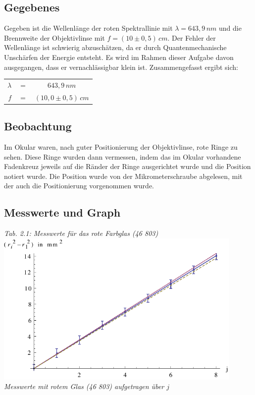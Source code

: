 \subsection{Gegebenes}
Gegeben ist die Wellenlänge der roten Spektrallinie mit \(\lambda = 643,9\,nm\) und die Brennweite der Objektivlinse mit \(f = (10\pm 0,5)\,cm\). Der Fehler der Wellenlänge ist schwierig abzuschätzen, da er durch Quantenmechanische Unschärfen der Energie entsteht. Es wird im Rahmen dieser  Aufgabe davon ausgegangen, dass er vernachlässigbar klein ist. Zusammengefasst ergibt sich:

\begin{center}
\begin{tabular}{rcc}
\(\lambda\) & \(=\) & \(643,9\, nm\) \\
\(f\) & \(=\) & \(\left( 10,0 \pm 0,5 \right)\, cm\) \\
\end{tabular}
\end{center}

\subsection{Beobachtung}
Im Okular waren, nach guter Positionierung der Objektivlinse, rote Ringe zu sehen. Diese Ringe wurden dann vermessen, indem das im Okular vorhandene Fadenkreuz jeweils auf die Ränder der Ringe ausgerichtet wurde und die Position notiert wurde. Die Position wurde von der Mikrometerschraube abgelesen, mit der auch die Positionierung vorgenommen wurde.

\subsection{Messwerte und Graph}
\begin{center}

{\it Tab. 2.1: Messwerte für das rote Farbglas (46 803)}
\includegraphics[width=12cm]{graphen/rot}
\\
{\it Messwerte mit rotem Glas (46 803) aufgetragen über \(j\)}
\end{center}

